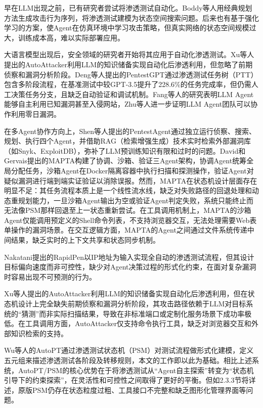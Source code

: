 早在LLM出现之前，已有研究者尝试将渗透测试自动化。Boddy等人\cite{Boddy2005Course}用经典规划方法生成攻击行为序列，将渗透测试建模为状态空间搜索问题。后来也有基于强化学习的方案\cite{Kong2025PentestR1}，使Agent在仿真环境中学习攻击策略，但真实网络的状态空间规模过大，训练成本高，难以实际部署应用。

大语言模型出现后，安全领域的研究者开始将其应用于自动化渗透测试。Xu等人提出的AutoAttacker\cite{Xu2024AutoAttacker}利用LLM的知识储备实现自动化后渗透利用，但忽略了前期侦察和漏洞分析阶段。Deng等人提出的PentestGPT\cite{Deng2024PentestGPT}通过渗透测试任务树（PTT）包含多阶段流程，在基准测试中较GPT-3.5提升了228.6\%的任务完成率，但仍需人工决策任务分支，且缺乏自动验证和调试机制。Fang等人\cite{Fang2024LLM}\cite{Fang2024LLMagents}的研究表明LLM Agent能够自主利用已知漏洞甚至入侵网站，Zhu等人\cite{Zhu2024Teams}进一步证明LLM Agent团队可以协作利用零日漏洞。

在多Agent协作方向上，Shen等人提出的PentestAgent\cite{Shen2025PentestAgent}通过独立运行侦察、搜索、规划、执行四个Agent，并借助RAG（检索增强生成）技术实时检索外部漏洞库（如Snyk、ExploitDB），弥补了LLM预训练知识有限和过时的问题。David和Gervais提出的MAPTA\cite{David2025MAPTA}构建了协调、沙箱、验证三Agent架构，协调Agent统筹全局分配任务，沙箱Agent在Docker隔离容器中执行扫描和探测操作，验证Agent对疑似漏洞进行端到端实证验证以消除误报。然而，MAPTA在状态机设计层面存在明显不足：其任务流程本质上是一个线性流水线，缺乏对失败路径的回退处理和动态重规划能力，一旦沙箱Agent输出为空或验证Agent判定失败，系统只能终止而无法像PSM那样回退至上一状态重新尝试。在工具调用机制上，MAPTA的沙箱Agent仅能调用预定义的Shell命令列表，不支持浏览器交互，无法处理需要Web表单操作的漏洞场景。在交互逻辑方面，MAPTA的Agent之间通过文件系统传递中间结果，缺乏实时的上下文共享和状态同步机制。

Nakatani提出的RapidPen\cite{Nakatani2025RapidPen}以IP地址为输入实现全自动的渗透测试流程，但其设计目标偏向速度而非可控性，缺少对Agent决策过程的形式化约束，在面对复杂漏洞时容易出现不可预测的行为。

Xu等人提出的AutoAttacker\cite{Xu2024AutoAttacker}利用LLM的知识储备实现自动化后渗透利用，但在状态机设计上完全缺失前期侦察和漏洞分析阶段，其攻击路径依赖于LLM对目标系统的“猜测”而非实际扫描结果，导致在非标准端口或定制化服务场景下成功率极低。在工具调用方面，AutoAttacker仅支持命令执行工具，缺乏对浏览器交互和外部知识检索的支持。

Wu等人的AutoPT\cite{Wu2024AutoPT}通过渗透测试状态机（PSM）对测试流程做形式化建模，定义五元组来描述渗透测试各阶段及转移规则，本文的工作即以此为基础。相比上述系统，AutoPT/PSM的核心优势在于将渗透测试从“Agent自主探索”转变为“状态机引导下的约束探索”，在灵活性和可控性之间取得了更好的平衡。但如2.3.3节将详述，原版PSM仍存在状态粒度过粗、工具接口不完整和缺乏图形化管理界面等问题。

